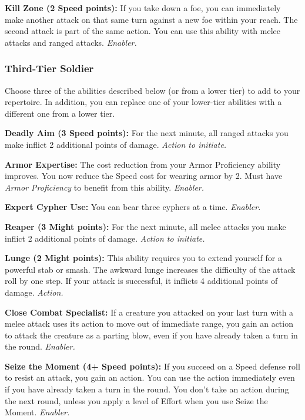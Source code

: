\documentclass[a4paper,10pt,final,twocolumn,oneside]{book}
\newcommand{\itemAbility}[2]{\textcolor{25gray}{\textbullet\textbf{ #1:}}{ #2}\par}
\newcommand{\enabler}{\textit{ Enabler.}}
\newcommand{\action}{\textit{ Action.}}
\newcommand{\actionInit}{\textit{ Action to initiate.}}
\begin{document}
\itemAbility{Kill Zone (2 Speed points)}{If you take down a foe, you can immediately make another attack on that same turn against a new foe within your reach. The second attack is part of the same action. You can use this ability with melee attacks and ranged attacks.\enabler}


\subsubsection*{Third-Tier Soldier}
\label{subsub:soldierThirdTier}

Choose three of the abilities described below (or from a lower tier) to add to your repertoire. In addition, you can replace one of your lower-tier abilities with a different one from a lower tier.

\itemAbility{Deadly Aim (3 Speed points)}{For the next minute, all ranged attacks you make inflict 2 additional points of damage.\actionInit}

\itemAbility{Armor Expertise}{The cost reduction from your Armor Proficiency ability improves. You now reduce the Speed cost for wearing armor by 2. Must have \textit{Armor Proficiency} to benefit from this ability.\enabler}

\itemAbility{Expert Cypher Use}{You can bear three cyphers at a time.\enabler}

\itemAbility{Reaper (3 Might points)}{For the next minute, all melee attacks you make inflict 2 additional points of damage.\actionInit}

\itemAbility{Lunge (2 Might points)}{This ability requires you to extend yourself for a powerful stab or smash. The awkward lunge increases the difficulty of the attack roll by one step. If your attack is successful, it inflicts 4 additional points of damage.\action}

\itemAbility{Close Combat Specialist}{If a creature you attacked on your last turn with a melee attack uses its action to move out of immediate range, you gain an action to attack the creature as a parting blow, even if you have already taken a turn in the round.\enabler}

\itemAbility{Seize the Moment (4+ Speed points)}{If you succeed on a Speed defense roll to resist an attack, you gain an action. You can use the action immediately even if you have already taken a turn in the round. You don’t take an action during the next round, unless you apply a level of Effort when you use Seize the Moment.\enabler}
\end{document}
